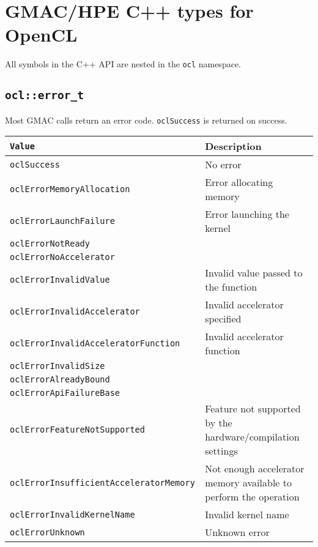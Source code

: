 \section{GMAC\slash HPE C++ types for OpenCL}

All symbols in the C++ API are nested in the \texttt{ocl} namespace.

\subsection{\texttt{ocl::error\_t}}

Most GMAC calls return an error code. \texttt{oclSuccess} is returned on success.
\vspace{11pt}\\
\begin{tabularx}{\linewidth}{|>{\texttt\bgroup}l<{\egroup}|X|}
  \hline
  \textnormal{Value} & Description \\
  \hline
  \hline
  oclSuccess                            & No error                             \\
  oclErrorMemoryAllocation              & Error allocating memory              \\
  oclErrorLaunchFailure                 & Error launching the kernel           \\
  oclErrorNotReady                      &                                      \\
  oclErrorNoAccelerator                 &                                      \\
  oclErrorInvalidValue                  & Invalid value passed to the function \\
  oclErrorInvalidAccelerator            & Invalid accelerator specified        \\
  oclErrorInvalidAcceleratorFunction    & Invalid accelerator function         \\
  oclErrorInvalidSize                   &                                      \\
  oclErrorAlreadyBound                  &                                      \\
  oclErrorApiFailureBase                &                                      \\
  oclErrorFeatureNotSupported           & Feature not supported by the hardware\slash{}compilation
                                          settings                             \\
  oclErrorInsufficientAcceleratorMemory & Not enough accelerator memory available to perform the 
                                          operation                            \\
  oclErrorInvalidKernelName             & Invalid kernel name                  \\
  oclErrorUnknown                       & Unknown error                        \\
  \hline
\end{tabularx}


